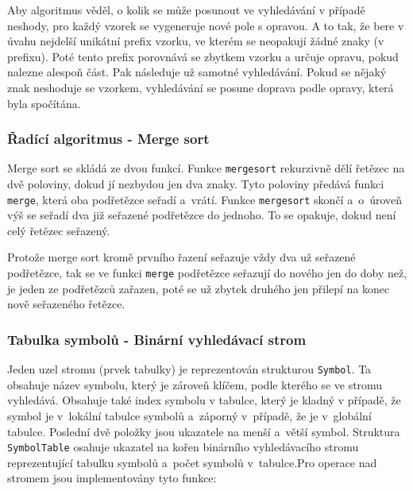 \documentclass[12pt,a4paper,titlepage,final]{article}
\begin{document}
Aby algoritmus věděl, o kolik se může posunout ve vyhledávání v případě neshody, 
pro každý vzorek se vygeneruje nové pole s opravou. A to tak, že bere v úvahu 
nejdelší unikátní prefix vzorku, ve kterém se neopakují žádné znaky (v prefixu). 
Poté tento prefix porovnává se zbytkem vzorku a určuje opravu, pokud nalezne alespoň část. 
Pak následuje už samotné vyhledávání. Pokud se nějaký znak neshoduje se vzorkem, 
vyhledávání se posune doprava podle opravy, která byla spočítána. 

\subsubsection{Řadící algoritmus - Merge sort}
Merge sort se skládá ze dvou funkcí. Funkce \texttt{mergesort} rekurzivně dělí 
řetězec na dvě poloviny, dokud jí nezbydou jen dva znaky. Tyto poloviny předává funkci
\texttt{merge}, která oba podřetězce seřadí a~vrátí. Funkce \texttt{mergesort} skončí 
a~o~úroveň výš se seřadí dva již seřazené podřetězce do jednoho. To se opakuje, dokud 
není celý řetězec seřazený.

Protože merge sort kromě prvního řazení seřazuje vždy dva už seřazené podřetězce, 
tak se ve funkci \texttt{merge} podřetězce seřazují do nového jen do doby než, 
je jeden ze podřetězců zařazen, poté se už zbytek druhého jen přilepí na konec nově 
seřazeného řetězce.  

\subsubsection{Tabulka symbolů - Binární vyhledávací strom}
Jeden uzel stromu (prvek tabulky) je reprezentován strukturou \texttt{Symbol}.
Ta obsahuje název symbolu, který je zároveň klíčem, podle kterého se ve stromu vyhledává. 
Obsahuje také index symbolu v tabulce, který je kladný v případě, že symbol je 
v~lokální tabulce symbolů a~záporný v~případě, že je v~globální tabulce. Poslední dvě 
položky jsou ukazatele na menší a~větší symbol. Struktura \texttt{SymbolTable} osahuje 
ukazatel na kořen binárního vyhledávacího stromu reprezentující tabulku symbolů a~počet 
symbolů v~tabulce.\newline\newline Pro operace nad stromem jsou implementovány tyto funkce:
\medskip
\end{document}

